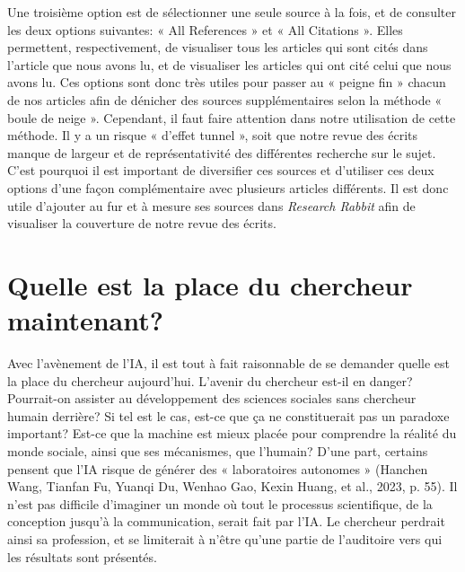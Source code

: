 \documentclass[
  letterpaper,
  DIV=11,
  numbers=noendperiod]{scrreprt}
\begin{document}
Une troisième option est de sélectionner une seule source à la fois, et
de consulter les deux options suivantes: « All References » et « All
Citations ». Elles permettent, respectivement, de visualiser tous les
articles qui sont cités dans l'article que nous avons lu, et de
visualiser les articles qui ont cité celui que nous avons lu. Ces
options sont donc très utiles pour passer au « peigne fin » chacun de
nos articles afin de dénicher des sources supplémentaires selon la
méthode « boule de neige ». Cependant, il faut faire attention dans
notre utilisation de cette méthode. Il y a un risque « d'effet tunnel »,
soit que notre revue des écrits manque de largeur et de représentativité
des différentes recherche sur le sujet. C'est pourquoi il est important
de diversifier ces sources et d'utiliser ces deux options d'une façon
complémentaire avec plusieurs articles différents. Il est donc utile
d'ajouter au fur et à mesure ses sources dans \emph{Research Rabbit}
afin de visualiser la couverture de notre revue des écrits.

\hypertarget{quelle-est-la-place-du-chercheur-maintenant}{%
\section{Quelle est la place du chercheur
maintenant?}\label{quelle-est-la-place-du-chercheur-maintenant}}

Avec l'avènement de l'IA, il est tout à fait raisonnable de se demander
quelle est la place du chercheur aujourd'hui. L'avenir du chercheur
est-il en danger? Pourrait-on assister au développement des sciences
sociales sans chercheur humain derrière? Si tel est le cas, est-ce que
ça ne constituerait pas un paradoxe important? Est-ce que la machine est
mieux placée pour comprendre la réalité du monde sociale, ainsi que ses
mécanismes, que l'humain? D'une part, certains pensent que l'IA risque
de générer des « laboratoires autonomes » (Hanchen Wang, Tianfan Fu,
Yuanqi Du, Wenhao Gao, Kexin Huang, et al., 2023, p. 55). Il n'est pas
difficile d'imaginer un monde où tout le processus scientifique, de la
conception jusqu'à la communication, serait fait par l'IA. Le chercheur
perdrait ainsi sa profession, et se limiterait à n'être qu'une partie de
l'auditoire vers qui les résultats sont présentés.
\end{document}
